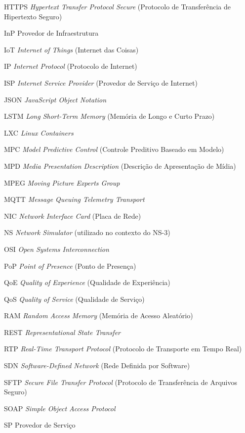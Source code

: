 \begin{siglas}
\item[HTTPS] \textit{Hypertext Transfer Protocol Secure} (Protocolo de Transferência de Hipertexto Seguro)
\item[InP] Provedor de Infraestrutura
\item[IoT] \textit{Internet of Things} (Internet das Coisas)
\item[IP] \textit{Internet Protocol} (Protocolo de Internet)
\item[ISP] \textit{Internet Service Provider} (Provedor de Serviço de Internet)
\item[JSON] \textit{JavaScript Object Notation}
\item[LSTM] \textit{Long Short-Term Memory} (Memória de Longo e Curto Prazo)
\item[LXC] \textit{Linux Containers}
\item[MPC] \textit{Model Predictive Control} (Controle Preditivo Baseado em Modelo)
\item[MPD] \textit{Media Presentation Description} (Descrição de Apresentação de Mídia)
\item[MPEG] \textit{Moving Picture Experts Group}
\item[MQTT] \textit{Message Queuing Telemetry Transport}
\item[NIC] \textit{Network Interface Card} (Placa de Rede)
\item[NS] \textit{Network Simulator} (utilizado no contexto do NS-3)
\item[OSI] \textit{Open Systems Interconnection}
\item[PoP] \textit{Point of Presence} (Ponto de Presença)
\item[QoE] \textit{Quality of Experience} (Qualidade de Experiência)
\item[QoS] \textit{Quality of Service} (Qualidade de Serviço)
\item[RAM] \textit{Random Access Memory} (Memória de Acesso Aleatório)
\item[REST] \textit{Representational State Transfer}
\item[RTP] \textit{Real-Time Transport Protocol} (Protocolo de Transporte em Tempo Real)
\item[SDN] \textit{Software-Defined Network} (Rede Definida por Software)
\item[SFTP] \textit{Secure File Transfer Protocol} (Protocolo de Transferência de Arquivos Seguro)
\item[SOAP] \textit{Simple Object Access Protocol}
\item[SP] Provedor de Serviço

\end{siglas}
